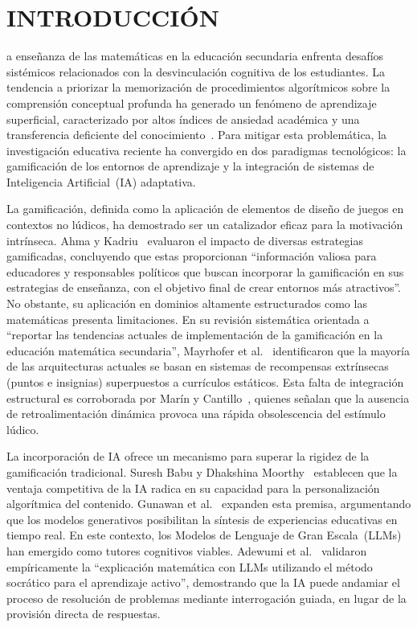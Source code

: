 \documentclass{ieeetj}
\begin{document}
\section{INTRODUCCIÓN}
a ense\~nanza de las matem\'aticas en la educaci\'on secundaria enfrenta desaf\'ios
sist\'emicos relacionados con la desvinculaci\'on cognitiva de los estudiantes. La tendencia a
priorizar la memorizaci\'on de procedimientos algor\'itmicos sobre la comprensi\'on conceptual
profunda ha generado un fen\'omeno de aprendizaje superficial, caracterizado por altos \'indices
de ansiedad acad\'emica y una transferencia deficiente del conocimiento~\cite{estrada2024impacto}.
Para mitigar esta problem\'atica, la investigaci\'on educativa reciente ha convergido en dos
paradigmas tecnol\'ogicos: la gamificaci\'on de los entornos de aprendizaje y la integraci\'on
de sistemas de Inteligencia Artificial~(IA) adaptativa.

La gamificaci\'on, definida como la aplicaci\'on de elementos de dise\~no de juegos en contextos
no l\'udicos, ha demostrado ser un catalizador eficaz para la motivaci\'on intr\'inseca.
Ahma y Kadriu~\cite{ahma2025exploring} evaluaron el impacto de diversas estrategias gamificadas,
concluyendo que estas proporcionan ``informaci\'on valiosa para educadores y responsables
pol\'iticos que buscan incorporar la gamificaci\'on en sus estrategias de ense\~nanza, con el
objetivo final de crear entornos m\'as atractivos''. No obstante, su aplicaci\'on en dominios
altamente estructurados como las matem\'aticas presenta limitaciones. En su revisi\'on
sistem\'atica orientada a ``reportar las tendencias actuales de implementaci\'on de la
gamificaci\'on en la educaci\'on matem\'atica secundaria'', Mayrhofer et al.~\cite{mayrhofer2025current}
identificaron que la mayor\'ia de las arquitecturas actuales se basan en sistemas de
recompensas extr\'insecas (puntos e insignias) superpuestos a curr\'iculos est\'aticos.
Esta falta de integraci\'on estructural es corroborada por Mar\'in y Cantillo~\cite{marin2025gamificacion},
quienes se\~nalan que la ausencia de retroalimentaci\'on din\'amica provoca una r\'apida
obsolescencia del est\'imulo l\'udico.

La incorporaci\'on de IA ofrece un mecanismo para superar la rigidez de la gamificaci\'on
tradicional. Suresh Babu y Dhakshina Moorthy~\cite{suresh2024application} establecen que la
ventaja competitiva de la IA radica en su capacidad para la personalizaci\'on algor\'itmica
del contenido. Gunawan et al.~\cite{gunawan2025future} expanden esta premisa, argumentando
que los modelos generativos posibilitan la s\'intesis de experiencias educativas en tiempo real.
En este contexto, los Modelos de Lenguaje de Gran Escala~(LLMs) han emergido como tutores
cognitivos viables. Adewumi et al.~\cite{adewumi2025findings} validaron emp\'iricamente la
``explicaci\'on matem\'atica con LLMs utilizando el m\'etodo socr\'atico para el aprendizaje
activo'', demostrando que la IA puede andamiar el proceso de resoluci\'on de problemas
mediante interrogaci\'on guiada, en lugar de la provisi\'on directa de respuestas.
\end{document}
